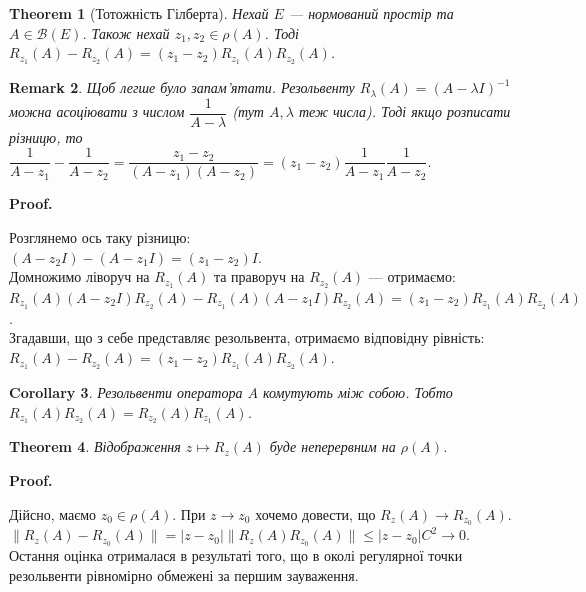 \documentclass[a4paper, 10pt]{article}
\makeatletter
\theoremstyle{theoremdd}
\newtheorem{theorem}{Theorem}[subsection]
\theoremstyle{theoremdd}
\theoremstyle{theoremdd}
\theoremstyle{theoremdd}
\theoremstyle{theoremdd}
\theoremstyle{theoremdd}
\newtheorem{remark}[theorem]{Remark}
\theoremstyle{theoremdd}
\theoremstyle{theoremdd}
\newtheorem{corollary}[theorem]{Corollary}
\renewenvironment{proof}[1][Proof.\\]{\par
\pushQED{\hfill \qed}%
\normalfont \topsep6\p@\@plus6\p@\relax
\trivlist
\item\relax
{\bfseries
#1\@addpunct{.}}\hspace\labelsep\ignorespaces
}{%
\popQED\endtrivlist\@endpefalse
}
\makeatother
\begin{document}
\begin{theorem}[Тотожність Гілберта]
Нехай $E$ --- нормований простір та $A \in \mathcal{B}(E)$. Також нехай $z_1,z_2 \in \rho(A)$. Тоді \\ $R_{z_1}(A) - R_{z_2}(A) = (z_1-z_2) R_{z_1}(A) R_{z_2}(A)$.
\end{theorem}

\begin{remark}
Щоб легше було запам'ятати. Резольвенту $R_{\lambda}(A) = (A-\lambda I)^{-1}$ можна асоціювати з числом $\dfrac{1}{A-\lambda}$ (тут $A,\lambda$ теж числа). Тоді якщо розписати різницю, то\\
$\dfrac{1}{A - z_1} - \dfrac{1}{A - z_2} = \dfrac{z_1-z_2}{(A-z_1)(A-z_2)} = (z_1-z_2) \dfrac{1}{A-z_1} \dfrac{1}{A-z_2}$.
\end{remark}

\begin{proof}
Розглянемо ось таку різницю:\\
$(A - z_2 I) - (A - z_1I) = (z_1 - z_2)I$.\\
Домножимо ліворуч на $R_{z_1}(A)$ та праворуч на $R_{z_2}(A)$ --- отримаємо:\\
$R_{z_1}(A) (A- z_2I) R_{z_2}(A) - R_{z_1}(A) (A - z_1I) R_{z_2}(A) = (z_1-z_2) R_{z_1}(A) R_{z_2}(A)$.\\
Згадавши, що з себе представляє резольвента, отримаємо відповідну рівність:\\
$R_{z_1}(A) - R_{z_2}(A) = (z_1-z_2) R_{z_1}(A) R_{z_2}(A)$.
\end{proof}

\begin{corollary}
Резольвенти оператора $A$ комутують між собою. Тобто $R_{z_1}(A) R_{z_2}(A) = R_{z_2}(A) R_{z_1}(A)$.
\end{corollary}

\begin{theorem}
Відображення $z \mapsto R_z(A)$ буде неперервним на $\rho(A)$.
\end{theorem}

\begin{proof}
Дійсно, маємо $z_0 \in \rho(A)$. При $z \to z_0$ хочемо довести, що $R_{z}(A) \to R_{z_0}(A)$.\\
$\| R_z(A) - R_{z_0}(A) \| = |z - z_0| \| R_z(A) R_{z_0}(A) \| \leq |z-z_0| C^2 \to 0$.\\
Остання оцінка отрималася в результаті того, що в околі регулярної точки резольвенти рівномірно обмежені за першим зауваження.
\end{proof}
\end{document}
